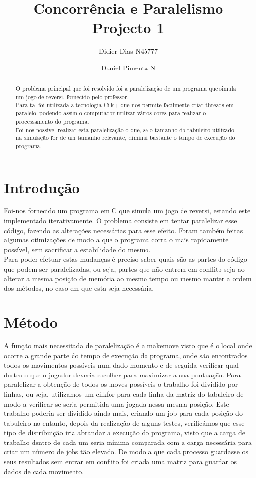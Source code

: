 \documentclass[a4paper]{article}
\title{Concorrência e Paralelismo \\
\large Projecto 1}
\author{Didier Dias N45777\and Daniel Pimenta N}
\begin{document}
\maketitle

\begin{abstract}
O problema principal que foi resolvido foi a paralelização de um programa que simula um jogo de reversi, fornecido pelo professor. \\
Para tal foi utilizada a tecnologia Cilk+ que nos permite facilmente criar threads em paralelo, podendo assim o computador utilizar vários cores para realizar o processamento do programa.\\
Foi nos possível realizar esta paralelização o que, se o  tamanho do tabuleiro utilizado na simulação for de um tamanho relevante, diminui bastante o tempo de execução do programa.
\end{abstract}

\section{Introdução}


Foi-nos fornecido um programa em C que simula um jogo de reversi, estando este implementado iterativamente. O problema consiste em tentar paralelizar esse código, fazendo as alterações necessárias para esse efeito. Foram também feitas algumas otimizações de modo a que o programa corra o mais rapidamente possível, sem sacrificar a estabilidade do mesmo.\\
Para poder efetuar estas mudanças é preciso saber quais são as partes do código que podem ser paralelizadas, ou seja, partes que não entrem em conflito seja ao alterar a mesma posição de memória ao mesmo tempo ou mesmo manter a ordem dos métodos, no caso em que esta seja necessária.

\section{Método}
A função mais necessitada de paralelização é a make\textunderscore move visto que é o local onde ocorre a grande parte do tempo de execução do programa, onde são encontrados todos os movimentos possíveis num dado momento e de seguida verificar qual destes o que o jogador deveria escolher para maximizar a sua pontuação. Para paralelizar a obtenção de todos os moves possíveis o trabalho foi dividido por linhas, ou seja, utilizamos um cilk\textunderscore for para cada linha da matriz do tabuleiro de modo a verificar se seria permitida uma jogada nessa mesma posição. Este trabalho poderia ser dividido ainda mais, criando um job para cada posição do tabuleiro no entanto, depois da realização de alguns testes, verificámos que esse tipo de distribuição iria abrandar a execução do programa, visto que a carga de trabalho dentro de cada um seria mínima comparada com a carga necessária para criar um número de jobs tão elevado.
De modo a que cada processo guardasse os seus resultados sem entrar em conflito foi criada uma matriz para guardar os dados de cada movimento.
\end{document}
